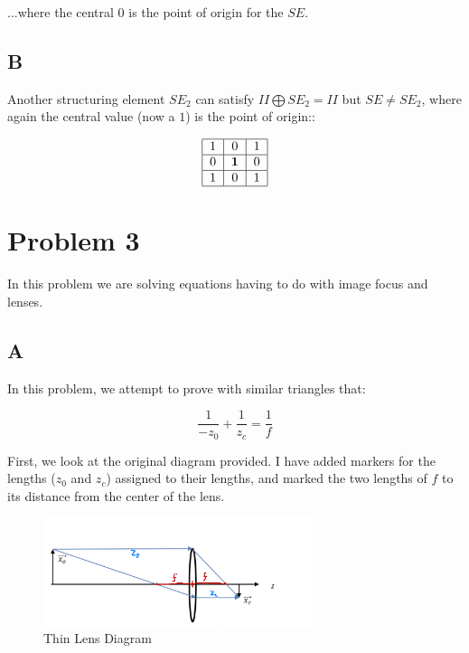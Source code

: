 \documentclass{article}
\begin{document}
\noindent ...where the central $0$ is the point of origin for the $SE$.

\subsection*{B}

Another structuring element $SE_2$ can satisfy $II\bigoplus SE_2 = II$ but $SE\neq SE_2$, where again the central value (now a $1$) is the point of origin::

\begin{equation}
    \begin{tabular}{ | c | c | c | }
        \hline
        1 & 0 & 1 \\
        \hline
        0 & \textbf{1} & 0 \\
        \hline
        1 & 0 & 1 \\
        \hline
    \end{tabular}
\end{equation}


\section*{Problem 3}

In this problem we are solving equations having to do with image focus and lenses.

\subsection*{A}


In this problem, we attempt to prove with similar triangles that:

\begin{equation}
    \frac{1}{-z_0} + \frac{1}{z_c} = \frac{1}{f}
\end{equation}

First, we look at the original diagram provided. I have added markers for the lengths ($z_0$ and $z_c$) assigned to their lengths, and marked the two lengths of $f$ to its distance from the center of the lens.

\begin{figure}[H]
    \centering
    \includegraphics[width = 0.7\textwidth]{imgs/prob_3.png}
    \caption{Thin Lens Diagram}
    \label{fig:prob1}
\end{figure}
\end{document}

